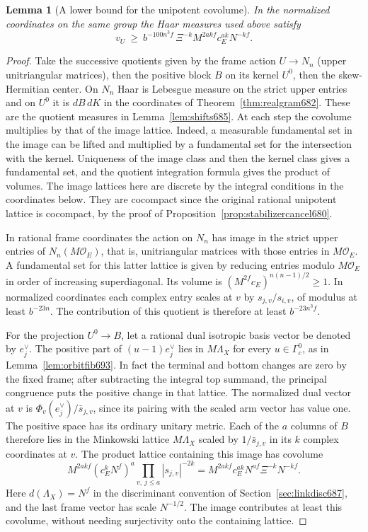 \documentclass[a4paper,11pt]{article}
\newtheorem{lemma}[proposition]{Lemma}
\theoremstyle{definition}
\theoremstyle{remark}
\numberwithin{equation}{section}
\begin{document}
\begin{lemma}[A lower bound for the unipotent covolume]\leavevmode
\label{lem:unipotentvolume703}
In the normalized coordinates on the same group the Haar
measures used above satisfy
\[
       v_U\ \ge\ b^{-100n^3f}\,
        \Xi^{-k} M^{2akf}c_E^{ak}N^{-kf}.
\]
\end{lemma}
\begin{proof}
Take the successive quotients given by the frame action
\(U\to N_n\) (upper unitriangular matrices), then the positive
block \(B\) on its kernel \(U^0\), then the skew-Hermitian
center. On \(N_n\) Haar is Lebesgue measure on the strict
upper entries and on \(U^0\) it is \(dB\,dK\) in the
coordinates of Theorem~\ref{thm:realgram682}. These are
the quotient measures in Lemma~\ref{lem:shifts685}. At
each step the covolume multiplies by that of the image
lattice. Indeed, a measurable fundamental set in the image
can be lifted and multiplied by a fundamental set for the
intersection with the kernel. Uniqueness of the image class
and then the kernel class gives a fundamental set, and the
quotient integration formula gives the product of volumes.
The image lattices here are discrete by the integral conditions
in the coordinates below. They are cocompact since the original
rational unipotent lattice is cocompact, by the proof of
Proposition~\ref{prop:stabilizercancel680}.

In rational frame coordinates the action on \(N_n\) has image
in the strict upper entries of \(N_n(M\mathcal O_E)\), that
is, unitriangular matrices with those entries in
\(M\mathcal O_E\). A fundamental set for this latter lattice
is given by reducing entries modulo \(M\mathcal O_E\) in
order of increasing superdiagonal. Its volume is
\((M^{2f}c_E)^{n(n-1)/2}\ge1\). In normalized coordinates
each complex entry scales at \(v\) by \(s_{j,v}/s_{i,v}\),
of modulus at least \(b^{-23n}\). The contribution of this
quotient is therefore at least \(b^{-23n^3 f}\).

For the projection \(U^0\to B\), let a rational dual isotropic
basis vector be denoted by \(e_j^\vee\). The positive part of
\((u-1)e_j^\vee\) lies in \(M\Lambda_X\) for every
\(u\in\Gamma_c^0\), as in Lemma~\ref{lem:orbitfib693}.
In fact the terminal and bottom changes are zero by the fixed
frame; after subtracting the integral top summand, the
principal congruence puts the positive change in that lattice.
The normalized dual vector at \(v\) is
\(\Phi_v(e_j^\vee)/\bar s_{j,v}\), since its pairing with the
scaled arm vector has value one. The positive space has its
ordinary unitary metric. Each of the \(a\) columns of \(B\)
therefore lies in the Minkowski lattice \(M\Lambda_X\) scaled
by \(1/\bar s_{j,v}\) in its \(k\) complex coordinates at \(v\).
The product lattice containing this image has covolume
\[
   M^{2akf}(c_E^k N^f)^a
          \prod_{v,\,j\le a}|s_{j,v}|^{-2k}
     =M^{2akf} c_E^{ak}N^{af}\Xi^{-k}N^{-kf}.
\]
Here \(d(\Lambda_X)=N^f\) in the discriminant convention of
Section~\ref{sec:linkdisc687}, and the last frame vector has
scale \(N^{-1/2}\). The image contributes at least this
covolume, without needing surjectivity onto the containing
lattice.


\end{proof}
\end{document}
